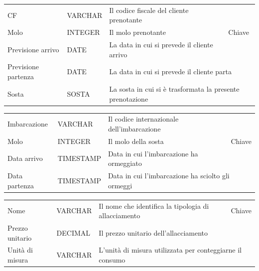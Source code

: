 \begin{center}
    \begin{tabularx}{\textwidth}{|l|l|l|X|}
        \hline
        \rowcolor{gray!30}
        \multicolumn{4}{|c|}{\textbf{Prenotazione}}\\
        \hline
        CF & VARCHAR & Il codice fiscale del cliente prenotante & \multirow{3}{*}{Chiave}\\
        \hhline{---}
        Molo & INTEGER & Il molo prenotante &\\
        \hhline{---}
        Previsione arrivo & DATE & La data in cui si prevede il cliente arrivo &\\
        \hline
        Previsione partenza & DATE & \multicolumn{2}{l|}{La data in cui si prevede il cliente parta}\\
        \hline
        Sosta & SOSTA & \multicolumn{2}{l|}{La sosta in cui si è trasformata la presente prenotazione}\\
        \hline
    \end{tabularx}
\end{center}

\begin{center}
    \begin{tabularx}{\textwidth}{|l|l|l|X|}
        \hline
        \rowcolor{gray!30}
        \multicolumn{4}{|c|}{\textbf{Sosta}}\\
        \hline
        Imbarcazione & VARCHAR & Il codice internazionale dell'imbarcazione & \multirow{3}{*}{Chiave}\\
        \hhline{---}
        Molo & INTEGER & Il molo della sosta &\\
        \hhline{---}
        Data arrivo & TIMESTAMP & Data in cui l'imbarcazione ha ormeggiato & \\
        \hline
        Data partenza & TIMESTAMP & \multicolumn{2}{l|}{Data in cui l'imbarcazione ha sciolto gli ormeggi} \\
        \hline
    \end{tabularx}
\end{center}

\begin{center}
    \begin{tabularx}{\textwidth}{|l|l|l|X|}
        \hline
        \rowcolor{gray!30}
        \multicolumn{4}{|c|}{\textbf{Allacciamento}}\\
        \hline
        Nome & VARCHAR & Il nome che identifica la tipologia di allacciamento &Chiave\\
        \hline
        Prezzo unitario & DECIMAL & \multicolumn{2}{l|}{Il prezzo unitario dell'allacciamento}\\
        \hline
        Unità di misura & VARCHAR & \multicolumn{2}{l|}{L'unità di misura utilizzata per conteggiarne il consumo}\\
        \hline
    \end{tabularx}
\end{center}

